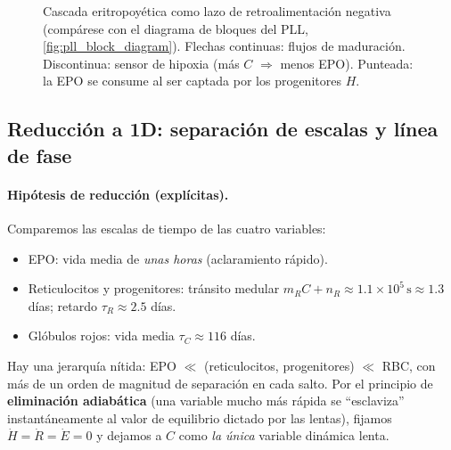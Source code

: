 \begin{figure}[htbp]
\centering
{}
\caption{Cascada eritropoyética como lazo de retroalimentación negativa (compárese con el diagrama de bloques del PLL, \cref{fig:pll_block_diagram}). Flechas continuas: flujos de maduración. Discontinua: sensor de hipoxia (más $C$ $\Rightarrow$ menos EPO). Punteada: la EPO se consume al ser captada por los progenitores $H$.}
\label{fig:eritro_cascada}
\end{figure}

\subsection{Reducción a 1D: separación de escalas y línea de fase}
\label{sec:eritro_1d}

\paragraph{Hipótesis de reducción (explícitas).} Comparemos las escalas de tiempo de las cuatro variables:
\begin{itemize}
    \item EPO: vida media de \emph{unas horas} (aclaramiento rápido).
    \item Reticulocitos y progenitores: tránsito medular $m_R C + n_R \approx 1.1\times10^{5}\,\mathrm{s}\approx 1.3$ días; retardo $\tau_R\approx 2.5$ días.
    \item Glóbulos rojos: vida media $\tau_C\approx 116$ días.
\end{itemize}
Hay una jerarquía nítida: EPO $\ll$ (reticulocitos, progenitores) $\ll$ RBC, con más de un orden de magnitud de separación en cada salto. Por el principio de \textbf{eliminación adiabática} (una variable mucho más rápida se ``esclaviza'' instantáneamente al valor de equilibrio dictado por las lentas), fijamos $\dot H=\dot R=\dot E=0$ y dejamos a $C$ como \emph{la única} variable dinámica lenta.

